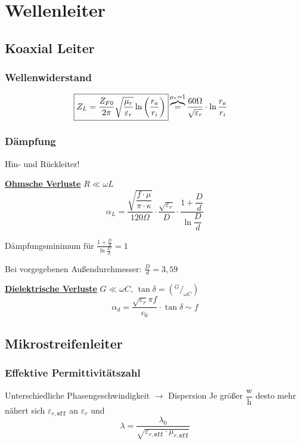 \section{Wellenleiter}
\subsection{Koaxial Leiter}
\subsubsection{Wellenwiderstand}


\begin{align*}
	\Aboxed{Z_L & = \frac{Z_{F0}}{2\pi}\sqrt{\frac{\mu_r}{\varepsilon_r}}\ln\left( \frac{r_a}{r_i} \right)}  \overbrace{=}^{ \mu_r=1}\frac{60\Omega}{\sqrt{\varepsilon_r}}\cdot \ln{\frac{r_a}{r_i}}
\end{align*}

\subsubsection{Dämpfung}
Hin- und Rückleiter!

\underline{\textbf{Ohmsche Verluste}} $R\ll\omega L$
\[
	\alpha_L = \frac{\sqrt{\dfrac{f\cdot\mu}{\pi\cdot\kappa}}}{120\Omega}\cdot\frac{\sqrt{\varepsilon_r}}{D}\cdot\dfrac{1+\dfrac{D}{d}}{\ln \dfrac{D}{d}}
\]

Dämpfungsminimum für $ \frac{1+\tfrac{D}{d}}{\ln \tfrac{D}{d}} = 1 $

Bei vorgegebenen Außendurchmesser: $ \frac{D}{d} =3,59 $

\vspace{1em}
\underline{\textbf{Dielektrische Verluste}} $G\ll\omega C$, $\tan\delta=
	(^G/_{\omega C})$
\[
	\alpha_d = \frac{\sqrt{\varepsilon_r}\pi f}{c_0}\cdot\tan\delta \sim f
\]

\subsection{Mikrostreifenleiter}


\subsubsection{Effektive Permittivitätszahl}
Unterschiedliche Phasengeschwindigkeit $\rightarrow$ Dispersion
Je größer $\dfrac{\mathrm{w}}{\mathrm{h}}$ desto mehr nähert sich
$\varepsilon_{r,\texttt{eff}}$ an $\varepsilon_r$ und
\[
	\lambda = \frac{\lambda_0}{\sqrt{\varepsilon_{r,\texttt{eff}}\cdot\mu_{r,\texttt{eff}}}}
\]

